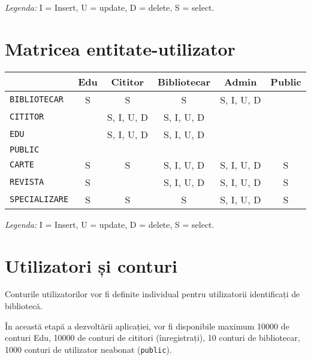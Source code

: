 \emph{Legenda:} I = Insert, U = update, D = delete, S = select.


\section{Matricea entitate-utilizator}
\label{sec:matr-eu}

\begin{center}
  \small
  \begin{tabular}{|l|c|c|c|c|c|}
    \hline
    & Edu & Cititor & Bibliotecar & Admin & Public \\
    \hline\hline
    \texttt{BIBLIOTECAR} & S & S & S & S, I, U, D & \\
    \hline
    \texttt{CITITOR} & & S, I, U, D & S, I, U, D & & \\
    \hline
    \texttt{EDU} & & S, I, U, D & S, I, U, D & & \\
    \hline
    \texttt{PUBLIC} & & & & & \\
    \hline
    \texttt{CARTE} & S & S & S, I, U, D & S, I, U, D & S \\
    \hline
    \texttt{REVISTA} & S & & S, I, U, D & S, I, U, D & S \\
    \hline
    \texttt{SPECIALIZARE} & S & S & S & S, I, U, D & S \\
    \hline
  \end{tabular}
\end{center}

\emph{Legenda:} I = Insert, U = update, D = delete, S = select.


\section{Utilizatori și conturi}
\label{sec:ut-cont}

Conturile utilizatorilor vor fi definite individual pentru utilizatorii
identificați de bibliotecă.

În această etapă a dezvoltării aplicației, vor fi disponibile maximum
10000 de conturi Edu, 10000 de conturi de cititori (înregistrați),
10 conturi de bibliotecar, 1000 conturi de utilizator neabonat
(\texttt{public}).




